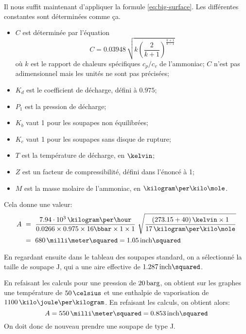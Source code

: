 Il nous suffit maintenant d'appliquer la formule \eqref{eq:big-surface}.
Les différentes constantes sont déterminées comme ça.
\begin{itemize}
    \item $C$ est déterminée par l'équation
        \begin{equation}
            C = 0.03948\,\sqrt{k\left(\frac{2}{k+1}\right)^\frac{k+1}{k-1}}
        \end{equation}
        où $k$ est le rapport de chaleurs spécifiques $c_p/c_v$ de l'ammoniac;
        $C$ n'est pas adimensionnel mais les unités ne sont pas précisées;
    \item $K_d$ est le coefficient de décharge, défini à $0.975$;
    \item $P_1$ est la pression de décharge;
    \item $K_b$ vaut 1 pour les soupapes non équilibrées;
    \item $K_c$ vaut 1 pour les soupapes sans disque de rupture;
    \item $T$ est la température de décharge, en $\kelvin$;
    \item $Z$ est un facteur de compressibilité, défini dans l'énoncé à 1;
    \item $M$ est la masse molaire de l'ammoniac, en $\kilogram\per\kilo\mole$.
\end{itemize}
Cela donne une valeur:
\begin{equation*}
    \begin{aligned}
        A\ &=\ \frac{7.94\cdot10^3\,\kilogram\per\hour}
        {0.0266 \times 0.975 \times 16\bbar \times 1 \times 1}\ 
        \sqrt{\frac{(273.15+40)\,\kelvin \times 1}{17\,\kilogram\per\kilo\mole}}
        \\
        &=\ 680\,\milli\meter\squared = 1.05\,\inch\squared
    \end{aligned}
\end{equation*}

En regardant ensuite dans le tableau des soupapes standard,
on a sélectionné la taille de soupape J, qui a une aire
effective de $1.287\,\inch\squared$.

En refaisant les calculs pour une pression de $20\,\mathrm{barg}$, on obtient sur
les graphes une température de $50\,\celsius$
et une enthalpie de vaporisation de $1100\,\kilo\joule\per\kilogram$.
En refaisant les calculs, on obtient alors:
\begin{equation*}
    A = 550\,\milli\meter\squared = 0.853\,\inch\squared
\end{equation*}
On doit donc de nouveau prendre une soupape de type J.

